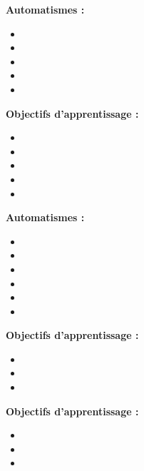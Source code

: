 \par\noindent\textbf{Automatismes :}
\begin{itemize}
    \item \useaut[C3B3aa]
    \item \useaut[C3B3ab]
    \item \useaut[C3B3ac]
    \item \useaut[C3B3ae]
    \item \useaut[C3B3ad]
\end{itemize}
\par\noindent\textbf{Objectifs d'apprentissage :}
\begin{itemize}
    \item \useobj[C3B3aa]
    \item \useobj[C3B3ab]
    \item \useobj[C3B3ac]
    \item \useobj[C3B3ad]
    \item \useobj[C3B3ae]
\end{itemize}
\endsequence

\par\noindent\textbf{Automatismes :}
\begin{itemize}
    \item \useaut[C3B3ba]
    \item \useaut[C3B3bb]
    \item \useaut[C3B3bc]
    \item \useaut[C3B3bd]
    \item \useaut[C3B3be]
    \item \useaut[C3B3bf]
\end{itemize}
\par\noindent\textbf{Objectifs d'apprentissage :}
\begin{itemize}
    \item \useobj[C3B3ba]
    \item \useobj[C3B3bb]
    \item \useobj[C3B3bc]
\end{itemize}
\endsequence

\par\noindent\textbf{Objectifs d'apprentissage :}
\begin{itemize}
    \item \useobj[C3B3ca]
    \item \useobj[C3B3cb]
    \item \useobj[C3B3cc]
\end{itemize}
\endsequence

